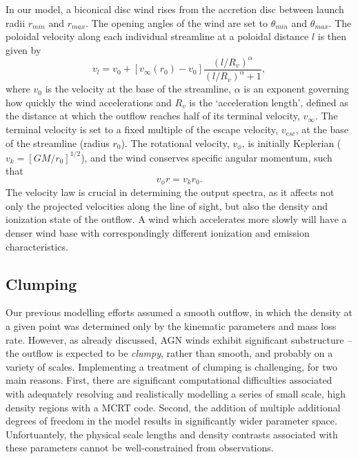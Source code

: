 \documentclass[preprint, a4paper, 11pt]{aastex}
\begin{document}
In our model, a biconical disc wind rises from the accretion 
disc between launch radii $r_{min}$ and $r_{max}$.
The opening angles of the wind are set to $\theta_{min}$ and $\theta_{max}$.
The poloidal velocity along each individual streamline at a poloidal distance $l$ 
is then given by
\begin{equation}
v_l=v_0+\left[v_{\infty}(r_0)-v_0\right]\frac{\left(l/R_v\right)^{\alpha}}{\left(l/R_v\right)^{\alpha}+1},
\label{v_law}
\end{equation}
where $v_0$ is the velocity at the base of the streamline, $\alpha$ is
an exponent governing how quickly the wind accelerations and 
$R_v$ is the `acceleration length', defined as the distance at which
the outflow reaches half of its terminal velocity, $v_{\infty}$.
The terminal velocity is set to a fixed multiple of the escape
velocity, $v_{esc}$, at the base of the streamline (radius $r_0$).
The rotational velocity, $v_{\phi}$, is initially Keplerian ($v_k = [GM/r_0]^{1/2}$),
and the wind conserves specific angular momentum, such that 
\begin{equation}
v_{\phi} r = v_k r_0.
\label{v_law}
\end{equation}
The velocity law is crucial in determining the output spectra,
as it affects not only the projected velocities along the line of sight,
but also the density and ionization state of the outflow.
A wind which accelerates more slowly will have a denser wind base
with correspondingly different ionization and emission characteristics.



\subsection{Clumping}

Our previous modelling efforts assumed a smooth outflow, 
in which the density at a given point was determined only by the 
kinematic parameters and mass loss rate. However, as already discussed,
AGN winds exhibit significant substructure -- the outflow is expected to be
{\em clumpy}, rather than smooth, and probably on a variety of scales. 
Implementing a treatment of clumping is challenging, for
two main reasons. First, there are significant 
computational difficulties associated with adequately
resolving and realistically modelling a series of small scale, high density
regions with a MCRT code. Second, the addition of multiple additional degrees of
freedom in the model results in significantly wider parameter space.
Unfortuantely, the physical scale lengths and density contrasts 
associated with these parameters cannot be well-constrained from observations.
\end{document}
